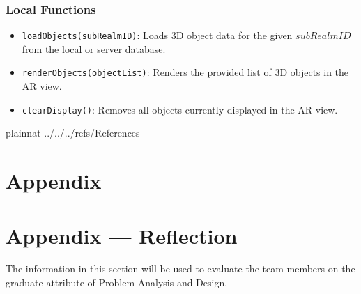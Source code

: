 \documentclass[12pt, titlepage]{article}
\begin{document}
\subsubsection{Local Functions}

\begin{itemize}
  \item \texttt{loadObjects(subRealmID)}: Loads 3D object data for the given \( subRealmID \) from the local or server database.
  \item \texttt{renderObjects(objectList)}: Renders the provided list of 3D objects in the AR view.
  \item \texttt{clearDisplay()}: Removes all objects currently displayed in the AR view.
\end{itemize}

\newpage

 {plainnat}
 {../../../refs/References}

\newpage

\section{Appendix} \label{Appendix}


\newpage{}

\section*{Appendix --- Reflection}


The information in this section will be used to evaluate the team members on the
graduate attribute of Problem Analysis and Design.


\end{document}
